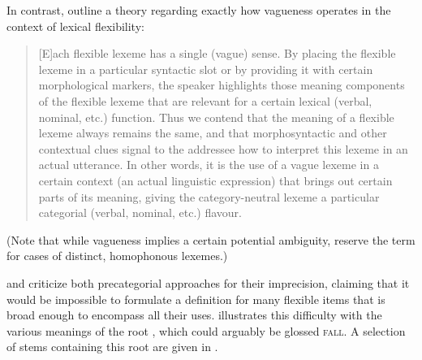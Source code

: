 In contrast, \textcite[539--541]{HengeveldRijkhoffSiewierska2004} outline a theory regarding exactly how vagueness operates in the context of lexical flexibility:

\blockquote[{\cite[541]{HengeveldRijkhoff2005}}]{[E]ach flexible lexeme has a single (vague) sense. By placing the flexible lexeme in a particular syntactic slot or by providing it with certain morphological markers, the speaker highlights those meaning components of the flexible lexeme that are relevant for a certain lexical (verbal, nominal, etc.) function. Thus we contend that the meaning of a flexible lexeme always remains the same, and that morphosyntactic and other contextual clues signal to the addressee how to interpret this lexeme in an actual utterance. In other words, it is the use of a vague lexeme in a certain context (an actual linguistic expression) that brings out certain parts of its meaning, giving the category-neutral lexeme a particular categorial (verbal, nominal, etc.) flavour.}

\noindent (Note that while vagueness implies a certain potential ambiguity, \citeauthor{HengeveldRijkhoff2005} reserve the term  for cases of distinct, homophonous lexemes.)

\textcite[363--364]{EvansOsada2005} and \textcite{Kihm2017} criticize both precategorial approaches for their imprecision, claiming that it would be impossible to formulate a definition for many flexible items that is broad enough to encompass all their uses. \textcite[87]{Kihm2017} illustrates this difficulty with the various meanings of the  root , which could arguably be glossed \textsc{fall}. A selection of stems containing this root are given in .

